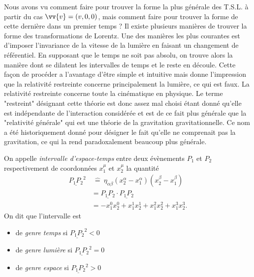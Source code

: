 \documentclass[a4paper,11pt]{report}
\begin{document}
            Nous avons vu comment faire pour trouver la forme la plus générale des T.S.L. à partir du cas $\vv{v} = (v,0,0)$, mais comment faire pour trouver la forme de cette dernière dans un premier temps ? Il existe plusieurs manières de trouver la forme des transformations de Lorentz. Une des manières les plus courantes est d'imposer l'invariance de la vitesse de la lumière en faisant un changement de référentiel. En supposant que le temps ne soit pas absolu, on trouve alors la manière dont se dilatent les intervalles de temps et le reste en découle. Cette façon de procéder a l'avantage d'être simple et intuitive mais donne l'impression que la relativité restreinte concerne principalement la lumière, ce qui est faux. La relativité restreinte concerne toute la cinématique en physique. Le terme "restreint" désignant cette théorie est donc assez mal choisi étant donné qu'elle est indépendante de l'interaction considérée et est de ce fait plus générale que la "relativité générale" qui est une théorie de la gravitation gravitationnelle. Ce nom a été historiquement donné pour désigner le fait qu'elle ne comprenait pas la gravitation, ce qui la rend paradoxalement beaucoup plus générale.
            
            \begin{definition}
                On appelle \textit{intervalle d'espace-temps} entre deux évènements $P_1$ et $P_2$ respectivement de coordonnées $x_1^\mu$ et $x_2^\mu$ la quantité
                \begin{align}
                    \underline{P_1P_2}^2&~\hat{=}~ \eta_{\alpha\beta}(x_2^\alpha-x_1^\alpha)(x_2^\beta-x_1^\beta) \\
                    &= \underline{P_1P_2}\cdot\underline{P_1P_2} \\
                    &= -x_1^0 x_2^0 + x_1^1 x_2^1 + x_1^2 x_2^2 + x_1^3 x_2^3.
                \end{align}
                $$$$
                On dit que l'intervalle est 
                \begin{itemize}[label = \textbullet]
                    \item de \textit{genre temps} si $\underline{P_1P_2}^2<0$
                    \item de \textit{genre lumière} si $\underline{P_1P_2}^2=0$
                    \item de \textit{genre espace} si $\underline{P_1P_2}^2>0$
                \end{itemize}
            \end{definition}
            
\end{document}
